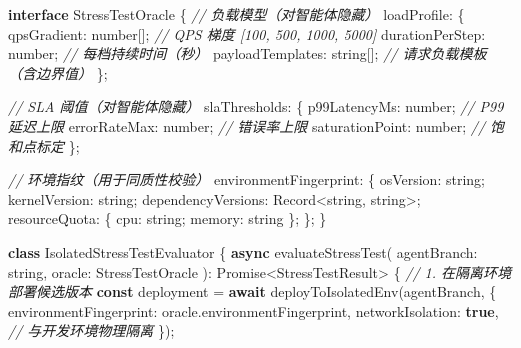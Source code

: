 \documentclass[
]{ctexart}
\newenvironment{Shaded}{}{}
\newcommand{\AttributeTok}[1]{\textcolor[rgb]{0.49,0.56,0.16}{#1}}
\newcommand{\BuiltInTok}[1]{\textcolor[rgb]{0.00,0.50,0.00}{#1}}
\newcommand{\CommentTok}[1]{\textcolor[rgb]{0.38,0.63,0.69}{\textit{#1}}}
\newcommand{\ControlFlowTok}[1]{\textcolor[rgb]{0.00,0.44,0.13}{\textbf{#1}}}
\newcommand{\DataTypeTok}[1]{\textcolor[rgb]{0.56,0.13,0.00}{#1}}
\newcommand{\FunctionTok}[1]{\textcolor[rgb]{0.02,0.16,0.49}{#1}}
\newcommand{\KeywordTok}[1]{\textcolor[rgb]{0.00,0.44,0.13}{\textbf{#1}}}
\newcommand{\NormalTok}[1]{#1}
\newcommand{\OperatorTok}[1]{\textcolor[rgb]{0.40,0.40,0.40}{#1}}
\renewcommand{\_}{\discretionary{}{}{\textunderscore}}
\begin{document}
\begin{Shaded}
\begin{Highlighting}[]
\KeywordTok{interface}\NormalTok{ StressTestOracle \{}
  \CommentTok{// 负载模型（对智能体隐藏）}
\NormalTok{  loadProfile}\OperatorTok{:}\NormalTok{ \{}
\NormalTok{    qpsGradient}\OperatorTok{:} \DataTypeTok{number}\NormalTok{[]}\OperatorTok{;}        \CommentTok{// QPS 梯度 [100, 500, 1000, 5000]}
\NormalTok{    durationPerStep}\OperatorTok{:} \DataTypeTok{number}\OperatorTok{;}      \CommentTok{// 每档持续时间（秒）}
\NormalTok{    payloadTemplates}\OperatorTok{:} \DataTypeTok{string}\NormalTok{[]}\OperatorTok{;}   \CommentTok{// 请求负载模板（含边界值）}
\NormalTok{  \}}\OperatorTok{;}

  \CommentTok{// SLA 阈值（对智能体隐藏）}
\NormalTok{  slaThresholds}\OperatorTok{:}\NormalTok{ \{}
\NormalTok{    p99LatencyMs}\OperatorTok{:} \DataTypeTok{number}\OperatorTok{;}         \CommentTok{// P99 延迟上限}
\NormalTok{    errorRateMax}\OperatorTok{:} \DataTypeTok{number}\OperatorTok{;}         \CommentTok{// 错误率上限}
\NormalTok{    saturationPoint}\OperatorTok{:} \DataTypeTok{number}\OperatorTok{;}      \CommentTok{// 饱和点标定}
\NormalTok{  \}}\OperatorTok{;}

  \CommentTok{// 环境指纹（用于同质性校验）}
\NormalTok{  environmentFingerprint}\OperatorTok{:}\NormalTok{ \{}
\NormalTok{    osVersion}\OperatorTok{:} \DataTypeTok{string}\OperatorTok{;}
\NormalTok{    kernelVersion}\OperatorTok{:} \DataTypeTok{string}\OperatorTok{;}
\NormalTok{    dependencyVersions}\OperatorTok{:} \BuiltInTok{Record}\OperatorTok{\textless{}}\DataTypeTok{string}\OperatorTok{,} \DataTypeTok{string}\OperatorTok{\textgreater{};}
\NormalTok{    resourceQuota}\OperatorTok{:}\NormalTok{ \{ cpu}\OperatorTok{:} \DataTypeTok{string}\OperatorTok{;}\NormalTok{ memory}\OperatorTok{:} \DataTypeTok{string}\NormalTok{ \}}\OperatorTok{;}
\NormalTok{  \}}\OperatorTok{;}
\NormalTok{\}}

\KeywordTok{class}\NormalTok{ IsolatedStressTestEvaluator \{}
  \KeywordTok{async} \FunctionTok{evaluateStressTest}\NormalTok{(}
\NormalTok{    agentBranch}\OperatorTok{:} \DataTypeTok{string}\OperatorTok{,}
\NormalTok{    oracle}\OperatorTok{:}\NormalTok{ StressTestOracle}
\NormalTok{  )}\OperatorTok{:} \BuiltInTok{Promise}\OperatorTok{\textless{}}\NormalTok{StressTestResult}\OperatorTok{\textgreater{}}\NormalTok{ \{}
    \CommentTok{// 1. 在隔离环境部署候选版本}
    \KeywordTok{const}\NormalTok{ deployment }\OperatorTok{=} \ControlFlowTok{await} \FunctionTok{deployToIsolatedEnv}\NormalTok{(agentBranch}\OperatorTok{,}\NormalTok{ \{}
\NormalTok{      environmentFingerprint}\OperatorTok{:}\NormalTok{ oracle}\OperatorTok{.}\AttributeTok{environmentFingerprint}\OperatorTok{,}
\NormalTok{      networkIsolation}\OperatorTok{:} \KeywordTok{true}\OperatorTok{,}  \CommentTok{// 与开发环境物理隔离}
\NormalTok{    \})}\OperatorTok{;}


\end{Highlighting}
\end{Shaded}
\end{document}

